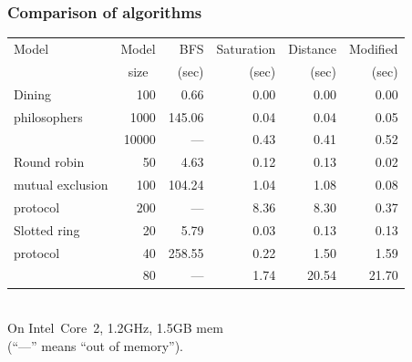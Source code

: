 \documentclass{beamer}
\begin{document}
\begin{frame}
  \frametitle{Comparison of algorithms}

  \vspace{-3.7mm}
  \begin{center}
    \begin{tabular}{|l|r||r|r|r|r|}
      \hline
      {\footnotesize Model} & \multicolumn{1}{|c||}{\footnotesize Model} & {\footnotesize BFS} & {\footnotesize Saturation} & {\footnotesize Distance} & {\footnotesize Modified} \\
      & \multicolumn{1}{|c||}{\footnotesize size}  & {\footnotesize (sec)}  & {\footnotesize (sec)}  & {\footnotesize (sec)} & {\footnotesize (sec)} \\
      \hline
      \hline
      {\footnotesize Dining} & 100 & 0.66 & 0.00 & 0.00 & 0.00 \\
      {\footnotesize philosophers} & 1000 & 145.06 & 0.04 & 0.04 & 0.05 \\
      & 10000 & --- & 0.43 & 0.41 & 0.52 \\
      \hline
      \hline
      {\footnotesize Round robin} & 50 & 4.63 & 0.12 & 0.13 & 0.02 \\
      {\footnotesize mutual exclusion} & 100 & 104.24 & 1.04 & 1.08 & 0.08 \\
      {\footnotesize protocol} & 200 & --- &8.36 & 8.30 & 0.37 \\
      \hline
      \hline
      {\footnotesize Slotted ring} & 20 & 5.79 & 0.03 & 0.13 & 0.13 \\
      {\footnotesize protocol}     & 40 & 258.55 & 0.22 & 1.50 & 1.59 \\
      {\footnotesize}             & 80 &   --- &  1.74 & 20.54 & 21.70 \\
      \hline
    \end{tabular}\\
    On Intel~Core~2, 1.2GHz, 1.5GB mem\\(``---'' means ``out of memory'').
  \end{center}

\end{frame}
\end{document}
